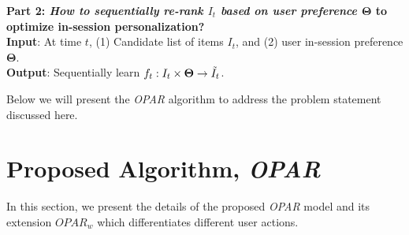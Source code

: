 \documentclass[11pt, dvipdfmx]{article}
\begin{document}
\noindent\textbf{Part 2: \textit{How to sequentially re-rank $I_{t}$ based on user preference $\mathbf{\Theta}$} to optimize in-session personalization?} \\
\noindent \textbf{Input}: At time $t$, (1) Candidate list of items $I_t$, and (2) user in-session preference $\mathbf{\Theta}$.\\
\noindent \textbf{Output}: Sequentially learn  $f_t: I_t \times \mathbf{\Theta} \rightarrow \Tilde{I}_t$.

Below we will present the \emph{OPAR} algorithm to address the problem statement discussed here. 




\section{Proposed Algorithm, \textit{OPAR}}\label{sec:model}
In this section, we present the details of the proposed \textit{OPAR} model and its extension $\textit{OPAR}_w$ which differentiates different  user actions. 
\end{document}
